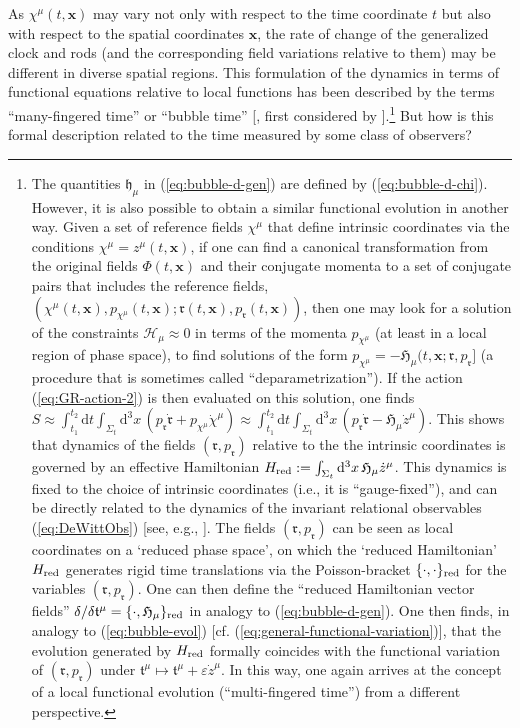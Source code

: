 \documentclass[12pt]{iopart}
\def\eref#1{(\ref{eq:#1})}
\def\D{\mathrm{d}}
\def\x{\mathbf{x}}
\begin{document}
As $\chi^{\mu}(t,\x)$ may vary not only with respect to the time coordinate $t$ but also with respect to the spatial coordinates $\x$, the rate of change of the generalized clock and rods (and the corresponding field variations relative to them) may be different in diverse spatial regions. This formulation of the dynamics in terms of functional equations relative to local functions has been described by the terms ``many-fingered time'' \citep[Chap. 21, Box 21.1]{Misner:1973prb} or ``bubble time'' [\citet{KucharBubble}, first considered by \citet{Tomonaga:1946zz}].\footnote{\label{foot:reduced}The quantities $\mathfrak{h}_{\mu}$ in \eref{bubble-d-gen} are defined by \eref{bubble-d-chi}. However, it is also possible to obtain a similar functional evolution in another way. Given a set of reference fields $\chi^{\mu}$ that define intrinsic coordinates via the conditions $\chi^{\mu}=z^{\mu}(t,\x)$, if one can find a canonical transformation from the original fields $\Phi(t,\x)$ and their conjugate momenta to a set of conjugate pairs that includes the reference fields, $(\chi^{\mu}(t,\x),p_{\chi^{\mu}}(t,\x); \mathfrak{r}(t,\x),p_{\mathfrak{r}}(t,\x))$, then one may look for a solution of the constraints $\mathcal{H}_{\mu}\approx0$ in terms of the momenta $p_{\chi^{\mu}}$ (at least in a local region of phase space), to find solutions of the form $p_{\chi^{\mu}} = -\mathfrak{H}_{\mu}(t,\x;\mathfrak{r},p_{\mathfrak{r}}]$ (a procedure that is sometimes called ``deparametrization''). If the action \eref{GR-action-2} is then evaluated on this solution, one finds $S \approx \int_{t_1}^{t_2}\D t\int_{\Sigma_t}\D^3x\,\left(p_{\mathfrak{r}}\dot{\mathfrak{r}}+p_{\chi^{\mu}}\dot{\chi}^{\mu}\right) \approx \int_{t_1}^{t_2}\D t\int_{\Sigma_t}\D^3x\,\left(p_{\mathfrak{r}}\dot{\mathfrak{r}}-\mathfrak{H}_{\mu}\dot{z}^{\mu}\right)$. This shows that dynamics of the fields $(\mathfrak{r}, p_{\mathfrak{r}})$ relative to the the intrinsic coordinates is governed by an effective Hamiltonian $H_{\rm red} := \int_{\Sigma_t}\D^3x\,\mathfrak{H}_{\mu}\dot{z}^{\mu}$. This dynamics is fixed to the choice of intrinsic coordinates (i.e., it is ``gauge-fixed''), and can be directly related to the dynamics of the invariant relational observables \eref{DeWittObs} [see, e.g., \cite{Barvinsky:1993jf,Chataig:Thesis}]. The fields $(\mathfrak{r}, p_{\mathfrak{r}})$ can be seen as local coordinates on a `reduced phase space', on which the `reduced Hamiltonian' $H_{\rm red}$ generates rigid time translations via the  Poisson-bracket $\{\cdot,\cdot\}_{\rm red}$ for the variables $(\mathfrak{r}, p_{\mathfrak{r}})$. One can then define the ``reduced Hamiltonian vector fields'' $\delta/\delta\mathfrak{t}^{\mu} = \{\cdot,\mathfrak{H}_{\mu}\}_{\rm red}$ in analogy to \eref{bubble-d-gen}. One then finds, in analogy to \eref{bubble-evol} [cf. \eref{general-functional-variation}], that the evolution generated by $H_{\rm red}$ formally coincides with the functional variation of $(\mathfrak{r}, p_{\mathfrak{r}})$ under $\mathfrak{t}^{\mu}\mapsto \mathfrak{t}^{\mu}+\varepsilon\dot{z}^{\mu}$. In this way, one again arrives at the concept of a local functional evolution (``multi-fingered time'') from a different perspective.} But how is this formal description related to the time measured by some class of observers?
\end{document}
